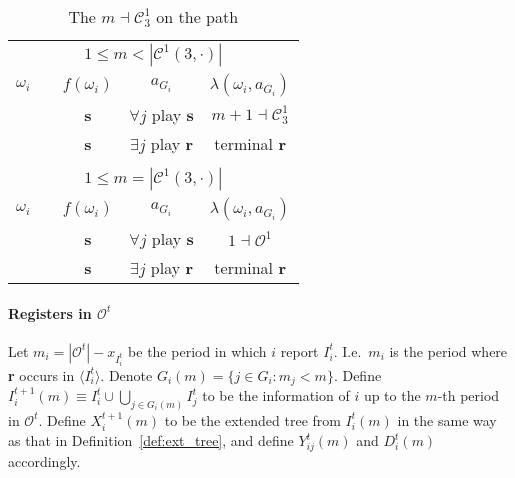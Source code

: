 \documentclass[12pt,letter]{article}
\newcommand{\Kappa}{\mathcal{C}}
\newcommand{\Omicron}{\mathcal{O}}
\theoremstyle{definition}
\theoremstyle{remark}
\theoremstyle{claim}
\begin{document}
\begin{table}[!htbp]
\caption{The $m\dashv\Kappa^1_{3}$ on the path}
\label{table:eqm_path_k03}
\begin{center}
\begin{tabular}{c c | c | c | c}
\multicolumn{5}{c}{$1\leq m < |\Kappa^1(3,\cdot)|$}\\
$\omega_i$ 	 & 	   &	$f(\omega_i)$  &	$a_{G_i}$ & $\lambda(\omega_i,a_{G_i})$ \\
\hline
\hline
  	&	& \textbf{s} & $\forall j$ play $\textbf{s}$ 	& $m+1\dashv \Kappa^1_{3}$\\
  	&  & \textbf{s}  &  $\exists j$ play $\textbf{r}$  	& terminal \textbf{r}\\
\hline
\\
\multicolumn{5}{c}{$1\leq m = |\Kappa^1(3,\cdot)|$}\\
$\omega_i$ 	 & 	   &	$f(\omega_i)$  &	$a_{G_i}$ & $\lambda(\omega_i,a_{G_i})$ \\
\hline
\hline
  	& 	& \textbf{s} & $\forall j$ play $\textbf{s}$ 	& $1\dashv \Omicron^1$\\
  	&  & \textbf{s}  &  $\exists j$ play $\textbf{r}$  	& terminal \textbf{r}\\
\hline
\end{tabular}
\end{center}
\end{table}



\clearpage

\paragraph{Registers in $\Omicron^t$}
Let $m_i=|\Omicron^t|-x_{I^t_i}$ be the period in which $i$ report $I^t_i$. I.e.~$m_i$ is the period where \textbf{r} occurs in $\langle I^t_i \rangle$. 
Denote $G_i(m)=\{j\in G_i: m_j<m\}$. Define $I^{t+1}_i(m)\equiv I^t_i\cup\bigcup_{j\in G_i(m)}I^t_j$ to be the information of $i$ up to the $m$-th period in $\Omicron^t$. 
Define $X^{t+1}_i(m)$ to be the extended tree from $I^t_i(m)$ in the same way as that in Definition~\ref{def:ext_tree}, and define $Y^t_{ij}(m)$ and $D^t_i(m)$ accordingly.
\end{document}
